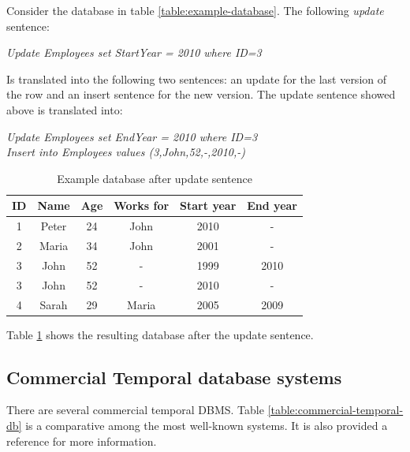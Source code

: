 \begin{example}
Consider the database in table \ref{table:example-database}. The following \emph{update} sentence:

\begin{center}
\emph{Update Employees set StartYear = 2010 where ID=3}
\end{center}

Is translated into the following two sentences: an update for the last version of the row and an insert sentence for the new version. The update sentence showed above is translated into:

\begin{center}
\emph{Update Employees set EndYear = 2010 where ID=3}\\
\emph{Insert into Employees values (3,John,52,-,2010,-)}
\end{center}


\begin{table}
\centering
\caption{Example database after update sentence}
\begin{tabular}{c c c c c c }
\hline
\textbf{ID} & \textbf{Name} & \textbf{Age} & \textbf{Works for} & \textbf{Start year} & \textbf{End year} \\ \hline
1 & Peter & 24 & John &  2010 & - \\
2 & Maria & 34 & John & 2001 & - \\
3 & John & 52 & - &  1999 & 2010 \\
3 & John & 52 & - &  2010 & - \\
4 & Sarah & 29 & Maria &  2005 & 2009 \\
\hline 
\end{tabular}
\label{table:example-database-update}



\end{table}


Table \ref{table:example-database-update} shows the resulting database after the update sentence.

\end{example}


\subsection{Commercial Temporal database systems}
There are several commercial temporal DBMS. Table \ref{table:commercial-temporal-db} is a comparative among the most well-known systems. It is also provided a reference for more information. 

